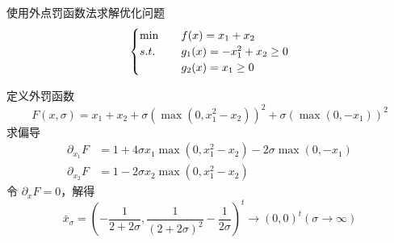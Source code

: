 \begin{example}
    使用外点罚函数法求解优化问题
    \[
        \begin{cases}
            \min \quad &f(x) = x_1 + x_2\\
            s.t. \quad &g_1(x) = -x_1^2 + x_2 \ge 0\\
            &g_2(x) = x_1 \ge 0
        \end{cases}
    \]

    \answer 定义外罚函数
    \[
        F(x, \sigma) = x_1 + x_2 + \sigma\left(\max(0, x_1^2 - x_2)\right)^2 + \sigma\left(\max(0, -x_1)\right)^2
    \]
    求偏导
    \begin{align*}
        \partial_{x_1}F &= 1 + 4\sigma x_1\max(0, x_1^2 - x_2) - 2\sigma\max(0, -x_1)\\
        \partial_{x_2}F &= 1 - 2\sigma x_2\max(0, x_1^2 - x_2)
    \end{align*}
    令 $\partial_{x}F = 0$，解得
    \[
        \bar{x}_\sigma = \left(-\frac{1}{2 + 2\sigma}, \frac{1}{(2 + 2\sigma)^2} - \frac{1}{2\sigma}\right)^t \to (0, 0)^t(\sigma \to \infty)
    \]
\end{example}

